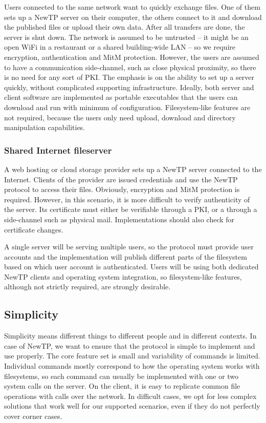 Users connected to the same network want to quickly exchange files. One of them sets up a NewTP server on
their computer, the others connect to it and download the published files or upload their own data. After all
transfers are done, the server is shut down. The network is assumed to be untrusted -- it might be an open WiFi
in a restaurant or a shared building-wide LAN -- so we require encryption, authentication and MitM protection.
However, the users are assumed to have a communication side-channel, such as close physical proximity, so
there is no need for any sort of PKI. The emphasis is on the ability to set up a server quickly, without
complicated supporting infrastructure. Ideally, both server and client software are implemented as portable
executables that the users can download and run with minimum of configuration. Filesystem-like features are
not required, because the users only need upload, download and directory manipulation capabilities.

%

\subsubsection{Shared Internet fileserver}

A web hosting or cloud storage provider sets up a NewTP server connected to the Internet. Clients of the
provider are issued credentials and use the NewTP protocol to access their files. Obviously, encryption and
MitM protection is required. However, in this scenario, it is more difficult to verify authenticity of the
server. Its certificate must either be verifiable through a PKI, or a through a side-channel such as physical
mail.  Implementations should also check for certificate changes.

A single server will be serving multiple users, so the protocol must provide user accounts and the
implementation will publish different parts of the filesystem based on which user account is authenticated.
Users will be using both dedicated NewTP clients and operating system integration, so filesystem-like
features, although not strictly required, are strongly desirable.

%

\subsection{Simplicity}

Simplicity means different things to different people and in different contexts. In case of NewTP, we want to
ensure that the protocol is simple to implement and use properly. The core feature set is small and
variability of commands is limited. Individual commands mostly correspond to how the operating system works
with filesystems, so each command can usually be implemented with one or two system calls on the server. On
the client, it is easy to replicate common file operations with calls over the network. In difficult cases, we
opt for less complex solutions that work well for our supported scenarios, even if they do not perfectly cover
corner cases.

